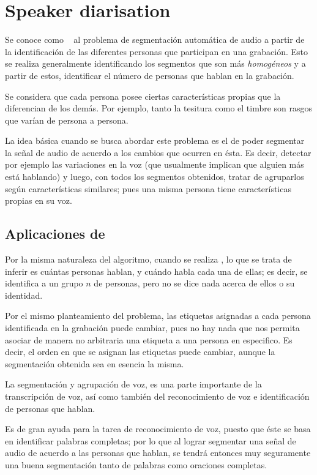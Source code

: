 
\chapter{Speaker diarisation}\label{ch:chap4}

Se conoce como \SD~ al problema de segmentación automática de audio a partir de la identificación de las diferentes personas que participan en una grabación. Esto se realiza generalmente identificando los segmentos que son más \textit{homogéneos} y a partir de estos, identificar el número de personas que hablan en la grabación.

Se considera que cada persona posee ciertas características propias que la diferencian de los demás. Por ejemplo, tanto la tesitura como el timbre son rasgos que varían de persona a persona.

La idea básica cuando se busca abordar este problema es el de poder segmentar la señal de audio de acuerdo a los cambios que ocurren en ésta. Es decir, detectar por ejemplo las variaciones en la voz (que usualmente implican que alguien más está hablando) y luego, con todos los segmentos obtenidos, tratar de agruparlos según características similares; pues una misma persona tiene características propias en su voz. 

\section{Aplicaciones de \sd}

Por la misma naturaleza del algoritmo, cuando se realiza \sd, lo que se trata de inferir es cuántas personas hablan, y cuándo habla cada una de ellas; es decir, se identifica a un grupo $n$ de personas, pero no se dice nada acerca de ellos o su identidad. 

Por el mismo planteamiento del problema, las etiquetas asignadas a cada persona identificada en la grabación puede cambiar, pues no hay nada que nos permita asociar de manera no arbitraria una etiqueta a una persona en especifico. Es decir, el orden en que se asignan las etiquetas puede cambiar, aunque la segmentación obtenida sea en esencia la misma.

La segmentación y agrupación de voz, es una parte importante de la transcripción de voz, así como también del reconocimiento de voz e identificación de personas que hablan. 

Es de gran ayuda para la tarea de reconocimiento de voz, puesto que éste se basa en identificar palabras completas; por lo que al lograr segmentar una señal de audio de acuerdo a las personas que hablan, se tendrá entonces muy seguramente una buena segmentación tanto de palabras como oraciones completas.

